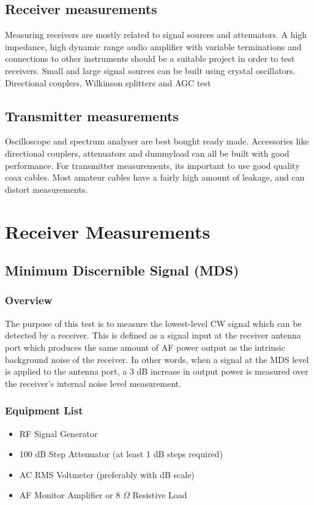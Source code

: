 \documentclass[10pt,letterpaper]{book}
\begin{document}
\section{Receiver measurements}
Measuring receivers are mostly related to signal sources and attenuators. A high impedance, high dynamic range audio amplifier with variable terminations and connections to other instruments should be a suitable project in order to test receivers. 
Small and large signal sources can be built using crystal oscillators. Directional couplers, Wilkinson splitters and AGC test 
\section{Transmitter measurements}
Oscilloscope and spectrum analyser are best bought ready made. Accessories like directional couplers, attenuators and dummyload can all be built with good performance. 
For transmitter measurements, its important to use good quality coax cables. Most amateur cables have a fairly high amount of leakage, and can distort measurements.  
\chapter{Receiver Measurements}
\section{Minimum Discernible Signal (MDS)}
\subsection*{Overview}
The purpose of this test is to measure the lowest-level CW signal which can be detected by a receiver. This is defined as a signal input at the receiver antenna port which produces the same amount of AF power output as the intrinsic background noise of the receiver. In other words, when a signal at the MDS level is applied to the antenna port, a 3 dB increase in output power is measured over the receiver's internal noise level measurement.
\subsection*{Equipment List}
\begin{itemize}
	\item RF Signal Generator
	\item 100 dB Step Attenuator (at least 1 dB steps required)
	\item AC RMS Voltmeter (preferably with dB scale)
	\item AF Monitor Amplifier or 8 $\Omega$ Resistive Load
\end{itemize}
\end{document}
